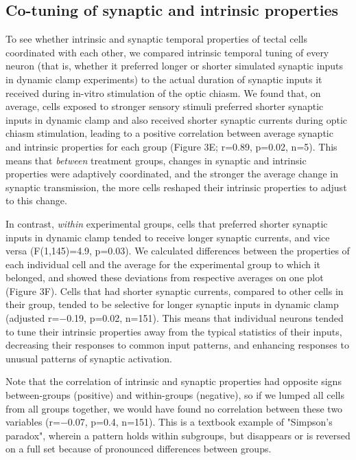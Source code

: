 \documentclass{article}
\begin{document}
\subsection*{Co-tuning of synaptic and intrinsic properties}

To see whether intrinsic and synaptic temporal properties of tectal cells coordinated with each other, we compared intrinsic temporal tuning of every neuron (that is, whether it preferred longer or shorter simulated synaptic inputs in dynamic clamp experiments) to the actual duration of synaptic inputs it received during in-vitro stimulation of the optic chiasm. We found that, on average, cells exposed to stronger sensory stimuli preferred shorter synaptic inputs in dynamic clamp and also received shorter synaptic currents during optic chiasm stimulation, leading to a positive correlation between average synaptic and intrinsic properties for each group (Figure 3E; r=0.89, p=0.02, n=5). This means that \textit{between} treatment groups, changes in synaptic and intrinsic properties were adaptively coordinated, and the stronger the average change in synaptic transmission, the more cells reshaped their intrinsic properties to adjust to this change.

In contrast, \textit{within} experimental groups, cells that preferred shorter synaptic inputs in dynamic clamp tended to receive longer synaptic currents, and vice versa (F(1,145)=4.9, p=0.03). We calculated differences between the properties of each individual cell and the average for the experimental group to which it belonged, and showed these deviations from respective averages on one plot (Figure 3F). Cells that had shorter synaptic currents, compared to other cells in their group, tended to be selective for longer synaptic inputs in dynamic clamp (adjusted r=$-$0.19, p=0.02, n=151). This means that individual neurons tended to tune their intrinsic properties away from the typical statistics of their inputs, decreasing their responses to common input patterns, and enhancing responses to unusual patterns of synaptic activation. %

Note that the correlation of intrinsic and synaptic properties had opposite signs between-groups (positive) and within-groups (negative), so if we lumped all cells from all groups together, we would have found no correlation between these two variables (r=$-$0.07, p=0.4, n=151). This is a textbook example of "Simpson's paradox", wherein a pattern holds within subgroups, but disappears or is reversed on a full set because of pronounced differences between groups.
\end{document}
